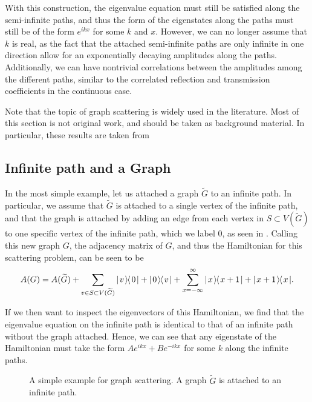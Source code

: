 \documentclass[../thesis-main/thesis-main]{subfiles}
\begin{document}
With this construction, the eigenvalue equation must still be satisfied along the semi-infinite paths, and thus the form of the eigenstates along the paths must still be of the form $e^{i k x}$ for some $k$ and $x$.  However, we can no longer assume that $k$ is real, as the fact that the attached semi-infinite paths are only infinite in one direction allow for an exponentially decaying amplitudes along the paths.  Additionally, we can have nontrivial correlations between the amplitudes among the different paths, similar to the correlated reflection and transmission coefficients in the continuous case.

Note that the topic of graph scattering is widely used in the literature.  Most of this section is not original work, and should be taken as background material.  In particular, these results are taken from \cite{FGG08, Chi09, CS11, CG12}


\subsection{Infinite path and a Graph}\label{sec:infinite_path_and_graph}

In the most simple example, let us attached a graph $\widetilde{G}$ to an infinite path.  In particular, we assume that $\widetilde{G}$ is attached to a single vertex of the infinite path, and that the graph is attached by adding an edge from each vertex in $S\subset V(\widetilde{G})$ to one specific vertex of the infinite path, which we label $0$, as seen in .  Calling this new graph $G$, the adjacency matrix of $G$, and thus the Hamiltonian for this scattering problem, can be seen to be
\begin{equation}
  A(G) = A(\widetilde{G}) + \sum_{v\in S \subset V(\widetilde{G})} |\mspace{2mu} v \mspace{2mu} \rangle\mspace{-2mu}\langle\mspace{2mu} 0 \mspace{2mu} | + |\mspace{2mu} 0 \mspace{2mu} \rangle\mspace{-2mu}\langle\mspace{2mu} v \mspace{2mu} | + \sum_{x=-\infty}^\infty |\mspace{2mu} x \mspace{2mu} \rangle\mspace{-2mu}\langle\mspace{2mu} x+1 \mspace{2mu} | + |\mspace{2mu} x+1 \mspace{2mu} \rangle\mspace{-2mu}\langle\mspace{2mu} x \mspace{2mu} |.
\end{equation}

If we then want to inspect the eigenvectors of this Hamiltonian, we find that the eigenvalue equation on the infinite path is identical to that of an infinite path without the graph attached.  Hence, we can see that any eigenstate of the Hamiltonian must take the form $Ae^{i k x} + Be^{-i k x}$ for some $k$ along the infinite paths.  


\begin{figure}
  \centering
  
  \caption{A simple example for graph scattering.  A graph $\widetilde{G}$ is attached to an infinite path.}
  \label{fig:path_and_graph}
\end{figure}
\end{document}
